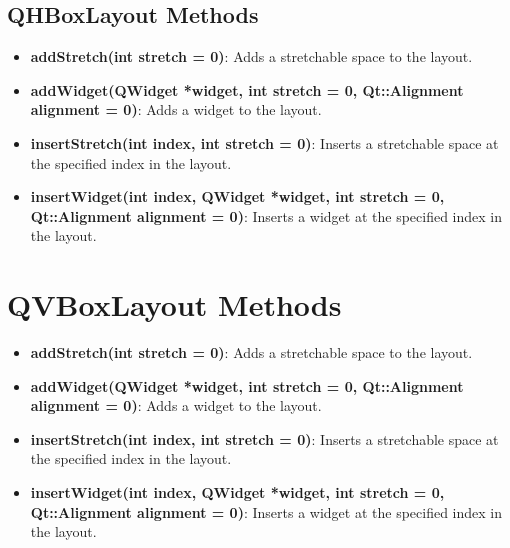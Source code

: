 \documentclass{report}
\begin{document}
    \pagebreak 

    \bigbreak \noindent 
    \subsection{QHBoxLayout Methods}
    \begin{itemize}
        \item \textbf{addStretch(int stretch = 0)}: Adds a stretchable space to the layout.
        \item \textbf{addWidget(QWidget *widget, int stretch = 0, Qt::Alignment alignment = 0)}: Adds a widget to the layout.
        \item \textbf{insertStretch(int index, int stretch = 0)}: Inserts a stretchable space at the specified index in the layout.
        \item \textbf{insertWidget(int index, QWidget *widget, int stretch = 0, Qt::Alignment alignment = 0)}: Inserts a widget at the specified index in the layout.
    \end{itemize}

    \bigbreak \noindent 
    \section{QVBoxLayout Methods}
    \begin{itemize}
        \item \textbf{addStretch(int stretch = 0)}: Adds a stretchable space to the layout.
        \item \textbf{addWidget(QWidget *widget, int stretch = 0, Qt::Alignment alignment = 0)}: Adds a widget to the layout.
        \item \textbf{insertStretch(int index, int stretch = 0)}: Inserts a stretchable space at the specified index in the layout.
        \item \textbf{insertWidget(int index, QWidget *widget, int stretch = 0, Qt::Alignment alignment = 0)}: Inserts a widget at the specified index in the layout.
    \end{itemize}

    \bigbreak \noindent 
\end{document}
